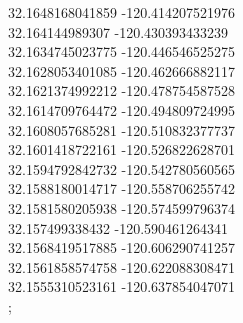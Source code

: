 {32.1648168041859	-120.414207521976\\
32.164144989307	-120.430393433239\\
32.1634745023775	-120.446546525275\\
32.1628053401085	-120.462666882117\\
32.1621374992212	-120.478754587528\\
32.1614709764472	-120.494809724995\\
32.1608057685281	-120.510832377737\\
32.1601418722161	-120.526822628701\\
32.1594792842732	-120.542780560565\\
32.1588180014717	-120.558706255742\\
32.1581580205938	-120.574599796374\\
32.157499338432	-120.590461264341\\
32.1568419517885	-120.606290741257\\
32.1561858574758	-120.622088308471\\
32.1555310523161	-120.637854047071\\
};